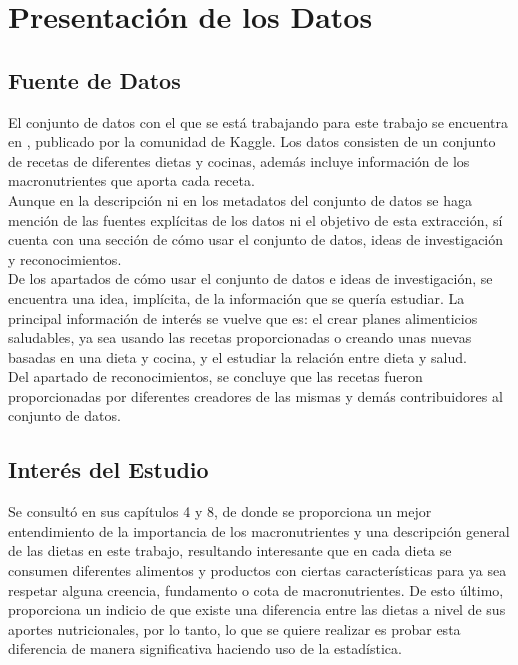 \documentclass[12pt,a4paper]{article}
\begin{document}
\newpage

\tableofcontents

\newpage

\section{Presentación de los Datos}

    \subsection{Fuente de Datos}
    El conjunto de datos con el que se está trabajando para este trabajo 
    se encuentra en \cite{dataset_macronutrients}, publicado por la comunidad 
    de Kaggle. Los datos consisten de un conjunto de recetas de diferentes 
    dietas y cocinas, además incluye información de los macronutrientes que 
    aporta cada receta.\\
    \cite{dataset_macronutrients} Aunque en la descripción ni en los metadatos del conjunto de datos se 
    haga mención de las fuentes explícitas de los datos ni el objetivo de 
    esta extracción, sí cuenta con una sección de cómo usar el conjunto de 
    datos, ideas de investigación y reconocimientos.\\
    De los apartados de cómo usar el conjunto de datos e ideas de investigación, 
    se encuentra una idea, implícita, de la información que se quería estudiar. 
    La principal información de interés se vuelve que es: el crear planes 
    alimenticios saludables, ya sea usando las recetas proporcionadas o creando 
    unas nuevas basadas en una dieta y cocina, y el estudiar la relación entre 
    dieta y salud.\\
    Del apartado de reconocimientos, se concluye que las recetas fueron 
    proporcionadas por diferentes creadores de las mismas y demás contribuidores 
    al conjunto de datos. 

    \subsection{Interés del Estudio}
    Se consultó \cite{marvastipopular} en sus 
    capítulos 4 y 8, de donde se proporciona un mejor entendimiento de la 
    importancia de los macronutrientes y una descripción general de las 
    dietas en este trabajo, resultando interesante que en cada dieta se 
    consumen diferentes alimentos y productos con ciertas características 
    para ya sea respetar alguna creencia, fundamento o cota de macronutrientes. 
    De esto último, proporciona un indicio de que existe una diferencia entre 
    las dietas a nivel de sus aportes nutricionales, por lo tanto, lo que se 
    quiere realizar es probar esta diferencia de manera significativa haciendo 
    uso de la estadística.
\end{document}
